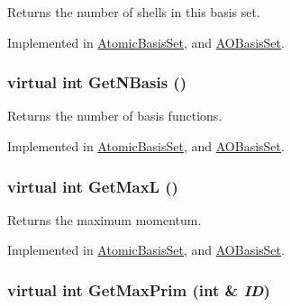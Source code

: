 Returns the number of shells in this basis set. 

Implemented in \hyperlink{classJKBuilder_1_1AtomicBasisSet_aa62be7e63d0f2b5828ab72cec3ce8590}{AtomicBasisSet}, and \hyperlink{classJKBuilder_1_1AOBasisSet_aa62be7e63d0f2b5828ab72cec3ce8590}{AOBasisSet}.\hypertarget{classJKBuilder_1_1BasisSet_a1167cdb6f1e1ba08ba6cbffa0b32ca77}{
\subsubsection[{GetNBasis}]{\setlength{\rightskip}{0pt plus 5cm}virtual int GetNBasis ()}}
\label{classJKBuilder_1_1BasisSet_a1167cdb6f1e1ba08ba6cbffa0b32ca77}


Returns the number of basis functions. 

Implemented in \hyperlink{classJKBuilder_1_1AtomicBasisSet_a297c144fb990284ac5973c99cdd55f91}{AtomicBasisSet}, and \hyperlink{classJKBuilder_1_1AOBasisSet_a297c144fb990284ac5973c99cdd55f91}{AOBasisSet}.\hypertarget{classJKBuilder_1_1BasisSet_a5580c8eff6cb4242a298c15da2292fa4}{
\subsubsection[{GetMaxL}]{\setlength{\rightskip}{0pt plus 5cm}virtual int GetMaxL ()}}
\label{classJKBuilder_1_1BasisSet_a5580c8eff6cb4242a298c15da2292fa4}


Returns the maximum momentum. 

Implemented in \hyperlink{classJKBuilder_1_1AtomicBasisSet_af6694a93cc5d86a8f3cd1aa984a0cdc3}{AtomicBasisSet}, and \hyperlink{classJKBuilder_1_1AOBasisSet_af6694a93cc5d86a8f3cd1aa984a0cdc3}{AOBasisSet}.\hypertarget{classJKBuilder_1_1BasisSet_a4e5f8295f4fe1ecf1a910ae2fcb46c1f}{
\subsubsection[{GetMaxPrim}]{\setlength{\rightskip}{0pt plus 5cm}virtual int GetMaxPrim (int \& {\em ID})}}
\label{classJKBuilder_1_1BasisSet_a4e5f8295f4fe1ecf1a910ae2fcb46c1f}


